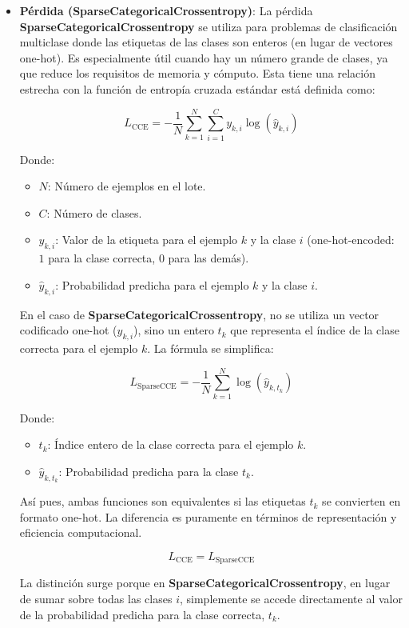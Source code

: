 \documentclass[../main.tex]{subfiles}
\begin{document}
\begin{itemize}
  

  \item \textbf{Pérdida (SparseCategoricalCrossentropy)}: 
  La pérdida \textbf{SparseCategoricalCrossentropy} se utiliza para problemas de clasificación multiclase donde las etiquetas de las clases son enteros (en lugar de vectores one-hot). Es especialmente útil cuando hay un número grande de clases, ya que reduce los requisitos de memoria y cómputo. Esta tiene una relación estrecha con la función de entropía cruzada estándar está definida como:

  \[
  L_{\text{CCE}} = -\frac{1}{N} \sum_{k=1}^{N} \sum_{i=1}^{C} y_{k,i} \log(\hat{y}_{k,i})
  \]

  Donde:

  \begin{itemize}
      \item \(N\): Número de ejemplos en el lote.
      \item \(C\): Número de clases.
      \item \(y_{k,i}\): Valor de la etiqueta para el ejemplo \(k\) y la clase \(i\) (one-hot-encoded: \(1\) para la clase correcta, \(0\) para las demás).
      \item \(\hat{y}_{k,i}\): Probabilidad predicha para el ejemplo \(k\) y la clase \(i\).
  \end{itemize}

  En el caso de \textbf{SparseCategoricalCrossentropy}, no se utiliza un vector codificado one-hot (\(y_{k,i}\)), sino un entero \(t_k\) que representa el índice de la clase correcta para el ejemplo \(k\). La fórmula se simplifica:

  \[
  L_{\text{SparseCCE}} = -\frac{1}{N} \sum_{k=1}^{N} \log(\hat{y}_{k,t_k})
  \]

  Donde:

  \begin{itemize}
      \item \(t_k\): Índice entero de la clase correcta para el ejemplo \(k\).
      \item \(\hat{y}_{k,t_k}\): Probabilidad predicha para la clase \(t_k\).
  \end{itemize}

  Así pues, ambas funciones son equivalentes si las etiquetas \(t_k\) se convierten en formato one-hot. La diferencia es puramente en términos de representación y eficiencia computacional.

  \[
  L_{\text{CCE}} = L_{\text{SparseCCE}}
  \]

  La distinción surge porque en \textbf{SparseCategoricalCrossentropy}, en lugar de sumar sobre todas las clases \(i\), simplemente se accede directamente al valor de la probabilidad predicha para la clase correcta, \(t_k\).


\end{itemize}
\end{document}

